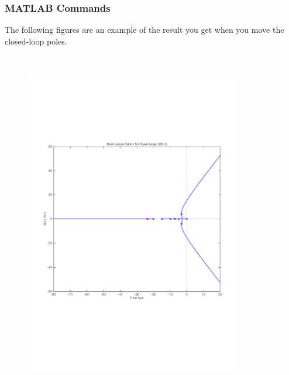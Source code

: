 \begin{frame}
\frametitle{MATLAB Commands}
	\begin{exampleblock}{}
		\justify
		The following figures are an example of the result you get when you move the closed-loop poles.
	\begin{columns}
		\begin{column}{0.5\textwidth}
			\begin{figure}
				\hbox{\hspace{1.4em}
				\includegraphics[width=0.9\linewidth]{matlab_ex4}}
			\end{figure}
		\end{column}
		\begin{column}{0.5\textwidth}
			\begin{figure}
				\hbox{\hspace{-0.6em}
}
\end{figure}
\end{column}
\end{columns}
\end{exampleblock}
\end{frame}
